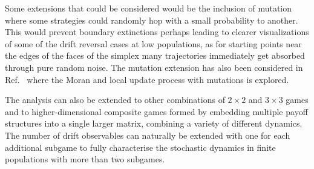\documentclass[%
 reprint,
 amsmath,amssymb,
 aps,
]{revtex4-2}
\begin{document}
Some extensions that could be considered would be the inclusion of mutation where some strategies could randomly hop with 
a small probability to another. This would prevent boundary extinctions perhaps 
leading to clearer visualizations of some of the drift reversal cases at low populations, 
as for starting points near the edges of the faces of the simplex many trajectories immediately 
get absorbed through pure random noise. The mutation extension has also been considered in
Ref.~\cite{general_moran_process} where the Moran and local update process with mutations is explored.

The analysis can also be extended to other combinations of $2 \times 2$ and 
$3 \times 3$ games and to higher-dimensional composite games
formed by embedding multiple payoff structures into a single larger matrix, combining a variety of
different dynamics. The number of drift observables can naturally be extended 
with one for each additional subgame
to fully characterise the stochastic dynamics in finite populations with more than two subgames.

\clearpage
\nocite{*}


\end{document}
